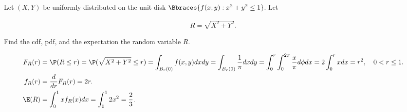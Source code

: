 
\begin{exercise}

Let $(X, Y)$ be uniformly distributed on the unit disk $\Bbraces{f(x; y): x^2 + y^2 \leq 1}$.
Let

\begin{align*}
    R = \sqrt{X^2 + Y^2}.
\end{align*}

Find the cdf, pdf, and the expectation the random variable $R$.

\end{exercise}


\begin{solution}

\begin{align*}
  F_R(r) &= \P(R \leq r) = \P(\sqrt{X^2 + Y^2} \leq r) = \int_{B_r(0)} f(x,y) dx dy
  = \int_{B_r(0)} \frac{1}{\pi} dx dy = \int_0^r\int_0^{2\pi} \frac{x}{\pi} d\phi dx
  = 2\int_0^r x dx = r^2, \quad 0 < r \leq 1. \\
  f_R(r) &= \frac{d}{dr}F_R(r) = 2r. \\
  \E(R) &= \int_0^1 x f_R(x) dx = \int_0^1 2x^2 = \frac{2}{3}.
\end{align*}

\end{solution}

